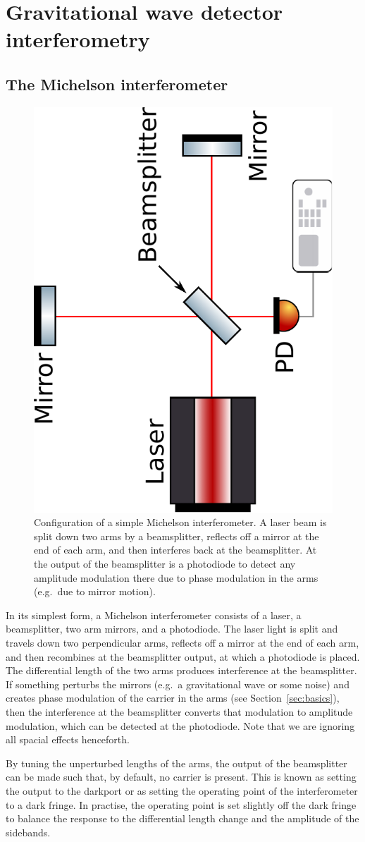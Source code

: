 \documentclass[aps,pra,superscriptaddress,reprint,nofootinbib]{revtex4-1}
\begin{document}
\section{Gravitational wave detector interferometry}
\label{sec:gwIFO}

\subsection{The Michelson interferometer}

\begin{figure}[ht]
	\begin{center}
	\includegraphics[height=0.35\textwidth, angle=-90]{figures/Michelson_interferometer.pdf}
	\end{center}
	\caption{Configuration of a simple Michelson interferometer. A laser beam is split down two arms by a beamsplitter, reflects off a mirror at the end of each arm, and then interferes back at the beamsplitter. At the output of the beamsplitter is a photodiode to detect any amplitude modulation there due to phase modulation in the arms (e.g.\ due to mirror motion).}
	\label{fig:Michelson}
\end{figure}

In its simplest form, a Michelson interferometer consists of a laser, a beamsplitter, two arm mirrors, and a photodiode. The laser light is split and travels down two perpendicular arms, reflects off a mirror at the end of each arm, and then recombines at the beamsplitter output, at which a photodiode is placed. The differential length of the two arms produces interference at the beamsplitter.
If something perturbs the mirrors (e.g.\ a gravitational wave or some noise) and creates phase modulation of the carrier in the arms (see Section~\ref{sec:basics}), then the interference at the beamsplitter converts that modulation to amplitude modulation, which can be detected at the photodiode.
Note that we are ignoring all spacial effects henceforth.


By tuning the unperturbed lengths of the arms, the output of the beamsplitter can be made such that, by default, no carrier is present. This is known as setting the output to the darkport or as setting the operating point of the interferometer to a dark fringe. In practise, the operating point is set slightly off the dark fringe to balance the response to the differential length change and the amplitude of the sidebands.
\end{document}
